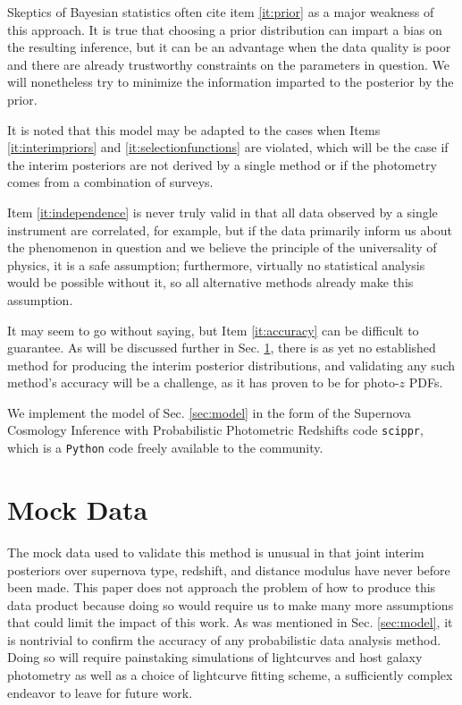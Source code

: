 \documentclass[12pt, onecolumn]{emulateapj}
\newcommand{\scippr}{\texttt{scippr}}
\begin{document}
Skeptics of Bayesian statistics often cite item \ref{it:prior} as a major weakness of this approach.  It is true that choosing a prior distribution can impart a bias on the resulting inference, but it can be an advantage when the data quality is poor and there are already trustworthy constraints on the parameters in question.  We will nonetheless try to minimize the information imparted to the posterior by the prior.

It is noted that this model may be adapted to the cases when Items \ref{it:interimpriors} and \ref{it:selectionfunctions} are violated, which will be the case if the interim posteriors are not derived by a single method or if the photometry comes from a combination of surveys.  

Item \ref{it:independence} is never truly valid in that all data observed by a single instrument are correlated, for example, but if the data primarily inform us about the phenomenon in question and we believe the principle of the universality of physics, it is a safe assumption; furthermore, virtually no statistical analysis would be possible without it, so all alternative methods already make this assumption.

It may seem to go without saying, but Item \ref{it:accuracy} can be difficult to guarantee.  As will be discussed further in Sec. \ref{sec:data}, there is as yet no established method for producing the interim posterior distributions, and validating any such method's accuracy will be a challenge, as it has proven to be for photo-$z$ PDFs.

We implement the model of Sec. \ref{sec:model} in the form of the Supernova Cosmology Inference with Probabilistic Photometric Redshifts code \scippr, which is a \texttt{Python} code freely available to the community.

\section{Mock Data}
\label{sec:data}

The mock data used to validate this method is unusual in that joint interim posteriors over supernova type, redshift, and distance modulus have never before been made.  This paper does not approach the problem of how to produce this data product because doing so would require us to make many more assumptions that could limit the impact of this work.  As was mentioned in Sec. \ref{sec:model}, it is nontrivial to confirm the accuracy of any probabilistic data analysis method.  Doing so will require painstaking simulations of lightcurves and host galaxy photometry as well as a choice of lightcurve fitting scheme, a sufficiently complex endeavor to leave for future work.  
\end{document}
